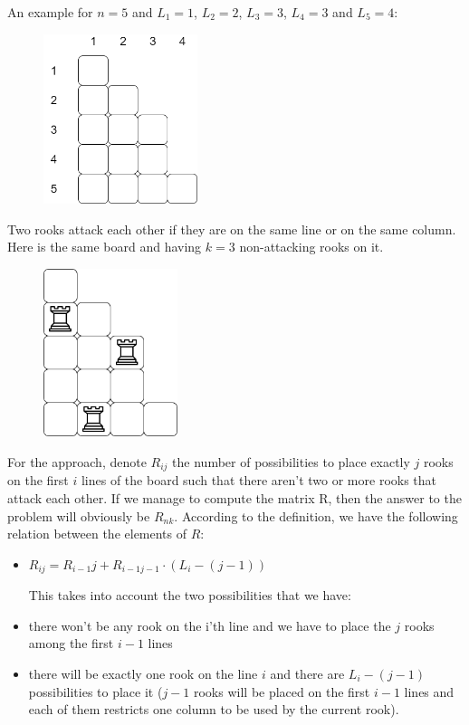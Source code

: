 \documentclass[letterpaper]{article}
\begin{document}
An example for $n = 5$ and $L_{1} = 1$, $L_{2} = 2$, $L_{3} = 3$, $L_{4} = 3$ and $L_{5} = 4$:

\begin{figure} [h!]
\centering
\includegraphics[width=0.40\textwidth]{pngOfDiagrams/dpchess1.png}
\end{figure}

Two rooks attack each other if they are on the same line or on the same column. Here is the same board and having $k = 3$ non-attacking rooks on it.

\begin{figure} [h!]
\centering
\includegraphics[width=0.35\textwidth]{pngOfDiagrams/dpchess2.png}
\end{figure}

For the approach, denote $R_{ij}$ the number of possibilities to place exactly $j$ rooks on the first $i$ lines of the board such that there aren't two or more rooks that attack each other. If we manage to compute the matrix R, then the answer to the problem will obviously be $R_{nk}$. According to the definition, we have the following relation between the elements of $R$:

\begin{itemize}
    \item $R_{ij} = R_{i - 1}{j} + R_{i - 1 j - 1} \cdot (L_{i} - (j - 1))$

    This takes into account the two possibilities that we have:

    \item there won't be any rook on the i'th line and we have to place the $j$ rooks among the first $i - 1$ lines
    \item there will be exactly one rook on the line $i$ and there are $L_{i} - (j - 1)$ possibilities to place it ($j - 1$ rooks will be placed on the first $i - 1$ lines and each of them restricts one column to be used by the current rook).
\end{itemize}
\end{document}
